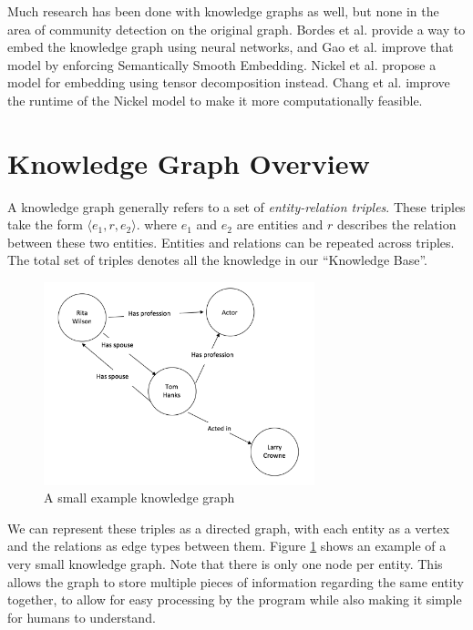 \documentclass[12pt]{article}
\begin{document}
Much research has been done with knowledge graphs as well, but none in the area
of community detection on the original graph. Bordes et al.\cite{Bordes2013}
provide a way to embed the knowledge graph using neural networks, and Gao et
al.\cite{Gao2015} improve that model by enforcing Semantically Smooth Embedding.
Nickel et al.\cite{Nickel2011} propose a model for embedding using tensor decomposition
instead. Chang et al.\cite{Chang2014} improve the runtime of the Nickel model to
make it more computationally feasible.

\section{Knowledge Graph Overview}
\label{Knowledge Graph Overview}

A knowledge graph generally refers to a set of \textit{entity-relation triples}.
These triples take the form $\langle e_1, r, e_2 \rangle$. where $e_1$ and $e_2$
are entities and $r$ describes the relation between these two entities. Entities
and relations can be repeated across triples. The total set of triples denotes
all the knowledge in our ``Knowledge Base''.

\begin{figure}[t!]
    \centering
    \includegraphics[width=0.7\textwidth,keepaspectratio]{figures/Example_KG.png}
    \caption{A small example knowledge graph}
    \label{fig: Example_KG}
\end{figure}

We can represent these triples as a directed graph, with each entity as a vertex
and the relations as edge types between them. Figure \ref{fig: Example_KG} shows
an example of a very small knowledge graph. Note that there is only one node per
entity. This allows the graph to store multiple pieces of information regarding
the same entity together, to allow for easy processing by the program while also
making it simple for humans to understand.
\end{document}

